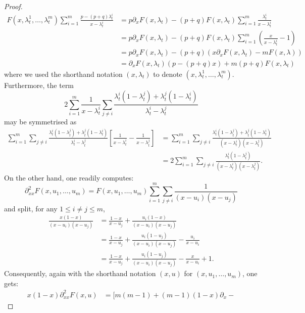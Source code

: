 \documentclass[12pt,reqno]{amsart}
\begin{document}
\begin{proof}
	\begin{align*}
		F(x, \lambda_t^1, \dots, \lambda_t^m) \sum_{i=1}^m\frac{p-(p+q)\lambda_t^i}{x-\lambda_t^i}
		 & = p\partial_x F(x,\lambda_t) - (p+q)F(x,\lambda_t)\sum_{i=1}^m \frac{\lambda^i_t}{x-\lambda_t^i} \\
		 & = p\partial_x F(x,\lambda_t) - (p+q)F(x,\lambda_t)\sum_{i=1}^m (\frac{x}{x-\lambda^i_{t}}-1)     \\
		 & = p\partial_x F(x,\lambda_t) - (p+q)(x\partial_x F(x,\lambda_t)-mF(x,\lambda))                   \\
		 & = \partial_x  F(x,\lambda_t)(p - (p+q)x)+m(p+q)F(x,\lambda_t)
	\end{align*}
	where we used the shorthand notation $(x,\lambda_t)$ to denote $(x,\lambda_t^1, \dots, \lambda_t^m)$.
	Furthermore, the term
	\begin{equation*}
		2\sum_{i=1}^m\frac{1}{x-\lambda_t^i} \sum_{j\neq i}\frac{\lambda_t^i(1-\lambda_t^j) + \lambda_t^j(1-\lambda_t^i)}{\lambda_t^i-\lambda_t^j}
	\end{equation*}
	may be symmetrised as
	\begin{align*}
		\sum_{i=1}^m\sum_{j\neq i} \frac{\lambda_t^i(1-\lambda_t^j) + \lambda_t^j(1-\lambda_t^i)}{\lambda_t^i-\lambda_t^j}\left[\frac{1}{x-\lambda_t^i} - \frac{1}{x-\lambda_t^j}\right]
		 & =\sum_{i=1}^m\sum_{j\neq i}\frac{\lambda_t^i(1-\lambda_t^j) + \lambda_t^j(1-\lambda_t^i)}{(x-\lambda_t^i)(x-\lambda_t^j)}
		\\& = 2 \sum_{i=1}^m\sum_{j\neq i}\frac{\lambda_t^i(1-\lambda_t^j)}{(x-\lambda_t^i)(x-\lambda_t^j)}.
	\end{align*}
	On the other hand, one readily computes:
	\begin{equation*}
		\partial_{xx}^2F(x, u_1, \dots, u_m) = F(x, u_1, \dots, u_m)\sum_{i=1}^m\sum_{j \neq i}\frac{1}{(x-u_i)(x-u_j)}
	\end{equation*}
	and split, for any $1 \leq i \neq j \leq m$,
	\begin{align*}
		\frac{x(1-x)}{(x-u_i)(x-u_j)} & = \frac{1-x}{x-u_j} + \frac{u_i(1-x)}{(x-u_i)(x-u_j)}
		\\& = \frac{1-x}{x-u_j} + \frac{u_i(1-u_j)}{(x-u_i)(x-u_j)} - \frac{u_i}{x-u_i}
		\\& = \frac{1-x}{x-u_j} + \frac{u_i(1-u_j)}{(x-u_i)(x-u_j)} - \frac{x}{x-u_i} + 1.
	\end{align*}
	Consequently, again with the shorthand notation $(x,u)$ for $(x,u_1, \dots, u_m)$, one gets:
	\begin{align*}
		x(1-x)\partial_{xx}^2F(x, u) & = [m(m-1) + (m-1)(1-x)\partial_x -

\end{align*}
\end{proof}
\end{document}
